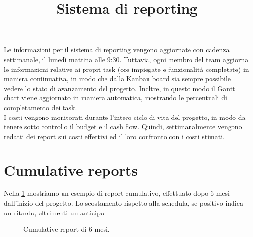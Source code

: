\documentclass[a4paper,12pt]{article}
\title{\textbf{Sistema di reporting}}
\author{}
\date{}
\begin{document}
\maketitle
\tableofcontents

\newpage

Le informazioni per il sistema di reporting vengono aggiornate con cadenza settimanale, il lunedì mattina alle 9:30.
Tuttavia, ogni membro del team aggiorna le informazioni relative ai propri task (ore impiegate e funzionalità
completate) in maniera continuativa, in modo che dalla Kanban board sia sempre possibile vedere lo stato di avanzamento
del progetto. Inoltre, in questo modo il Gantt chart viene aggiornato in maniera automatica, mostrando le percentuali
di completamento dei task. \\
I costi vengono monitorati durante l'intero ciclo di vita del progetto, in modo da tenere sotto controllo il budget e
il cash flow. Quindi, settimanalmente vengono redatti dei report sui costi effettivi ed il loro confronto con i costi
stimati.

\section{Cumulative reports}
Nella \cref{fig:cumulative-report} mostriamo un esempio di report cumulativo, effettuato dopo 6 mesi dall'inizio del
progetto. Lo scostamento rispetto alla schedula, se positivo indica un ritardo, altrimenti un anticipo.

\begin{figure}[h]
    \centering
    \caption{Cumulative report di 6 mesi.}
    \label{fig:cumulative-report}
\end{figure}
\end{document}
